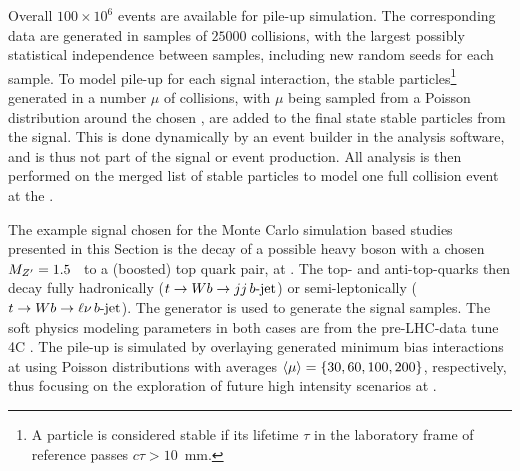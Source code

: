 Overall $100\times 10^{6}$ \MB{} events are available for 
pile-up simulation. The corresponding data are generated in samples of 
$25000$ \MB{} collisions, with the largest possibly statistical 
independence between samples, including new random seeds for each sample. 
To model pile-up for each signal interaction, the stable 
particles\footnote{A particle is considered stable if its lifetime $\tau$ 
in the laboratory frame of reference passes $c\tau > 10$~mm.} generated 
in a number $\mu$ of \MB{} collisions, with $\mu$ being sampled from a 
Poisson distribution around the chosen \axing, are added to the final 
state stable particles from the signal. This is done dynamically by an 
event builder in the analysis software, and is thus not part of the 
signal or \MB{} event production. All analysis is then performed on 
the merged list of stable particles to model one full collision event 
at the \LHC. 



The example signal chosen for the Monte Carlo simulation based studies
presented in this Section is the decay of a possible heavy \Zprime{}
boson with a chosen $M_{Z'} = 1.5$~\tev{} to a (boosted) top
quark pair, at . The top- and anti-top-quarks then decay 
fully hadronically ($t \to W b \to jj\,b\mbox{-}{\rm jet}$) or 
semi-leptonically ($t \to W b \to \ell \nu\,b\mbox{-}{\rm jet}$). 
The \pythia{} generator \cite{pythia,pythia8} is used to generate the 
signal samples. The soft physics modeling parameters in both cases are 
from the pre-LHC-data tune 4C  \cite{Corke:2010yf}.  
The pile-up is simulated by overlaying generated minimum bias
\pp{} interactions at  using Poisson distributions with
averages $\langle\mu\rangle = \{ 30, 60, 100, 200 \}$, respectively, thus
focusing on the exploration of future high intensity scenarios at
\LHC.



